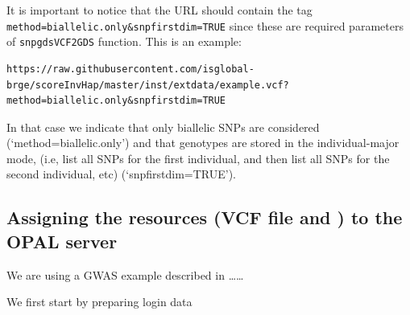 \documentclass[]{article}
\newenvironment{Shaded}{\begin{snugshade}}{\end{snugshade}}
\newcommand{\DataTypeTok}[1]{\textcolor[rgb]{0.13,0.29,0.53}{#1}}
\newcommand{\KeywordTok}[1]{\textcolor[rgb]{0.13,0.29,0.53}{\textbf{#1}}}
\newcommand{\NormalTok}[1]{#1}
\newcommand{\OperatorTok}[1]{\textcolor[rgb]{0.81,0.36,0.00}{\textbf{#1}}}
\newcommand{\OtherTok}[1]{\textcolor[rgb]{0.56,0.35,0.01}{#1}}
\newcommand{\StringTok}[1]{\textcolor[rgb]{0.31,0.60,0.02}{#1}}
\begin{document}
It is important to notice that the URL should contain the tag
\texttt{method=biallelic.only\&snpfirstdim=TRUE} since these are
required parameters of \texttt{snpgdsVCF2GDS} function. This is an
example:

\begin{verbatim}
https://raw.githubusercontent.com/isglobal-brge/scoreInvHap/master/inst/extdata/example.vcf?method=biallelic.only&snpfirstdim=TRUE
\end{verbatim}

In that case we indicate that only biallelic SNPs are considered
(`method=biallelic.only') and that genotypes are stored in the
individual-major mode, (i.e, list all SNPs for the first individual, and
then list all SNPs for the second individual, etc) (`snpfirstdim=TRUE').

\hypertarget{assigning-the-resources-vcf-file-and-to-the-opal-server}{%
\subsection{Assigning the resources (VCF file and ) to the OPAL
server}\label{assigning-the-resources-vcf-file-and-to-the-opal-server}}

We are using a GWAS example described in \ldots\ldots{}

We first start by preparing login data

\begin{Shaded}
\end{Shaded}
\end{document}
